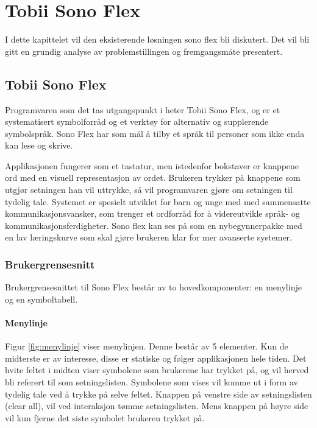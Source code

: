 

\chapter{Tobii Sono Flex}

I dette kapittelet vil den eksisterende løsningen sono flex bli diskutert. Det vil bli gitt en grundig analyse av problemstillingen og fremgangsmåte presentert.


\section{Tobii Sono Flex}
\label{chap:Tobii-Sono-Flex}


Programvaren som det tas utgangspunkt i heter Tobii Sono Flex,  og er et systematisert symbolforråd og et verktøy for alternativ og supplerende symbolspråk. Sono Flex har som mål å tilby et språk til personer som ikke enda kan lese og skrive. 

Applikasjonen fungerer som et tastatur, men istedenfor bokstaver er knappene ord med en visuell representasjon av ordet. Brukeren trykker på knappene som utgjør setningen han vil uttrykke, så vil programvaren gjøre om setningen til tydelig tale.  Systemet er spesielt utviklet for barn og unge med med sammensatte kommunikasjonsvansker, som trenger et ordforråd for å videreutvikle språk- og kommunikasjonsferdigheter. Sono flex kan ses på som en nybegynnerpakke med en lav læringskurve som skal gjøre brukeren klar for mer avanserte systemer. 


\subsection{Brukergrensesnitt}

Brukergrensesnittet til Sono Flex består av to hovedkomponenter: en menylinje og en symboltabell. 


\subsubsection{Menylinje}

Figur \ref{fig:menylinje} viser menylinjen.  Denne består av 5 elementer.  Kun de midterste er av interesse, disse  er statiske og følger applikasjonen hele tiden. Det hvite feltet i midten viser symbolene som brukerene har trykket på, og vil herved bli referert til som setningslisten. Symbolene som vises vil komme ut i form av tydelig tale ved å trykke på selve feltet. Knappen på venstre side av setningslisten (clear all), vil ved interaksjon tømme setningslisten. Mens knappen på høyre side vil kun fjerne det siste symbolet brukeren trykket på.


